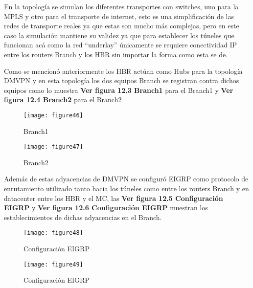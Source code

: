 En la topología se simulan los diferentes transportes con switches, uno para la MPLS y otro para el transporte de internet, esto es una simplificación de las redes de transporte reales ya que estas son mucho más complejas, pero en este caso la simulación mantiene su validez ya que para establecer los túneles que funcionan acá como la red “underlay” únicamente se requiere conectividad IP entre los routers Branch y los HBR sin importar la forma como esta se de.

Como se mencionó anteriormente los HBR actúan como Hubs para la topología DMVPN y en esta topología los dos equipos Branch se registran contra dichos equipos como lo muestra \textbf{Ver figura 12.3 Branch1} para el Branch1 y \textbf{Ver figura 12.4 Branch2} para el Branch2

\begin{figure}[htbp]
  \centering
    {\texttt{[image: figure46]}}%
  \caption{Branch1}
  \label{fig:fig2subfig}
\end{figure}


\begin{figure}[htbp]
  \centering
    {\texttt{[image: figure47]}}%
  \caption{Branch2}
  \label{fig:fig2subfig}
\end{figure}

Además de estas adyacencias de DMVPN se configuró EIGRP como protocolo de enrutamiento utilizado tanto hacia los túneles como entre los routers Branch y en datacenter entre los HBR y el MC, las \textbf{Ver figura 12.5 Configuración EIGRP} y \textbf{Ver figura 12.6 Configuración EIGRP} muestran los establecimientos de dichas adyacencias en el Branch.

\begin{figure}[htbp]
  \centering
    {\texttt{[image: figure48]}}%
  \caption{Configuración EIGRP}
  \label{fig:fig2subfig}
\end{figure}


\begin{figure}[htbp]
  \centering
    {\texttt{[image: figure49]}}%
  \caption{Configuración EIGRP}
  \label{fig:fig2subfig}
\end{figure}

